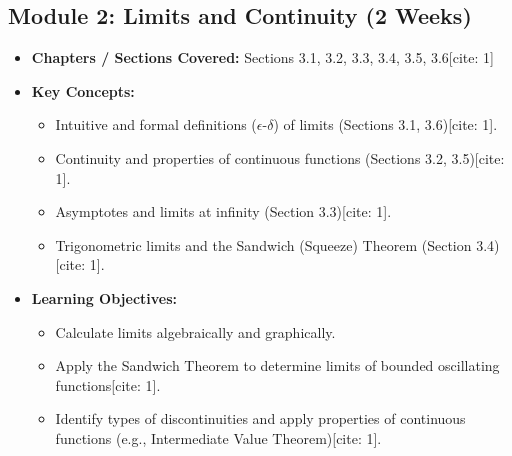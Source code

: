 \documentclass[11pt,a4paper]{article}
\begin{document}
\subsection*{Module 2: Limits and Continuity (2 Weeks) \cite{1}}
\begin{itemize}
    \item \textbf{Chapters / Sections Covered:} Sections 3.1, 3.2, 3.3, 3.4, 3.5, 3.6[cite: 1]
    \item \textbf{Key Concepts:}
    \begin{itemize}
        \item Intuitive and formal definitions ($\epsilon$-$\delta$) of limits (Sections 3.1, 3.6)[cite: 1].
        \item Continuity and properties of continuous functions (Sections 3.2, 3.5)[cite: 1].
        \item Asymptotes and limits at infinity (Section 3.3)[cite: 1].
        \item Trigonometric limits and the Sandwich (Squeeze) Theorem (Section 3.4)[cite: 1].
    \end{itemize}
    \item \textbf{Learning Objectives:}
    \begin{itemize}
        \item Calculate limits algebraically and graphically.
        \item Apply the Sandwich Theorem to determine limits of bounded oscillating functions[cite: 1].
        \item Identify types of discontinuities and apply properties of continuous functions (e.g., Intermediate Value Theorem)[cite: 1].
    \end{itemize}
\end{itemize}
\end{document}
